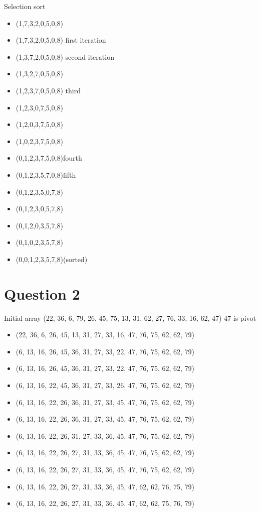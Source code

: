 \documentclass{article}
\begin{document}
Selection sort
\begin{itemize}
\item (1,7,3,2,0,5,0,8)
\item (1,7,3,2,0,5,0,8) first iteration
\item (1,3,7,2,0,5,0,8) second iteration
\item (1,3,2,7,0,5,0,8)
\item (1,2,3,7,0,5,0,8) third
\item (1,2,3,0,7,5,0,8)
\item (1,2,0,3,7,5,0,8)
\item (1,0,2,3,7,5,0,8)
\item (0,1,2,3,7,5,0,8)fourth
\item (0,1,2,3,5,7,0,8)fifth
\item (0,1,2,3,5,0,7,8)
\item (0,1,2,3,0,5,7,8)
\item (0,1,2,0,3,5,7,8)
\item (0,1,0,2,3,5,7,8)
\item (0,0,1,2,3,5,7,8)(sorted)
\end{itemize}





\section*{Question 2}
Initial array (22, 36, 6, 79, 26, 45, 75, 13, 31, 62, 27, 76, 33, 16, 62, 47) 47 is pivot
\begin{itemize}
\item (22, 36, 6, 26, 45, 13, 31, 27, 33, 16, 47, 76, 75, 62, 62, 79)
\item (6, 13, 16, 26, 45, 36, 31, 27, 33, 22, 47, 76, 75, 62, 62, 79)
\item (6, 13, 16, 26, 45, 36, 31, 27, 33, 22, 47, 76, 75, 62, 62, 79)
\item (6, 13, 16, 22, 45, 36, 31, 27, 33, 26, 47, 76, 75, 62, 62, 79)
\item (6, 13, 16, 22, 26, 36, 31, 27, 33, 45, 47, 76, 75, 62, 62, 79)
\item (6, 13, 16, 22, 26, 36, 31, 27, 33, 45, 47, 76, 75, 62, 62, 79)
\item (6, 13, 16, 22, 26, 31, 27, 33, 36, 45, 47, 76, 75, 62, 62, 79)
\item (6, 13, 16, 22, 26, 27, 31, 33, 36, 45, 47, 76, 75, 62, 62, 79)
\item (6, 13, 16, 22, 26, 27, 31, 33, 36, 45, 47, 76, 75, 62, 62, 79)
\item (6, 13, 16, 22, 26, 27, 31, 33, 36, 45, 47, 62, 62, 76, 75, 79)
\item (6, 13, 16, 22, 26, 27, 31, 33, 36, 45, 47, 62, 62, 75, 76, 79)
\end{itemize}
\end{document}
